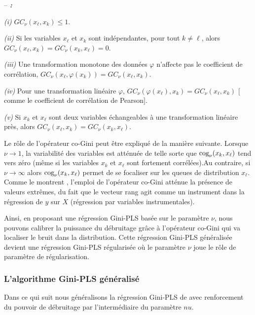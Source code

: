 \begin{property}\label{prop1} -- \textbf{\emph{\citet{Schechtman03}:}}
	
	\noindent \emph{(i)} $GC_\nu(x_\ell,x_k) \leq 1$.
	
	\noindent\emph{(ii)} Si les variables $x_\ell$ et $x_k$ sont indépendantes, pour tout $k\neq \ell$, alors $GC_\nu(x_\ell,x_k) = GC_\nu(x_k,x_\ell) =0$.
	
	\noindent\emph{(iii)} Une transformation monotone des données $\varphi$ n'affecte pas le coefficient de corrélation, $GC_\nu(x_\ell,\varphi(x_k)) = GC_\nu(x_\ell,x_k)$.
	
	\noindent\emph{(iv)} Pour une transformation linéaire $\varphi$, $GC_\nu(\varphi(x_\ell),x_k) = GC_\nu(x_\ell,x_k)$ $[$comme le coefficient de corrélation de Pearson$]$.
	
	\noindent\emph{(v)} Si $x_k$ et $x_\ell$ sont deux variables échangeables à une transformation linéaire près, alors $GC_\nu(x_\ell,x_k) = GC_\nu(x_k,x_\ell)$.
\end{property}

Le rôle de l'opérateur co-Gini peut être expliqué de la manière suivante. Lorsque $\nu \rightarrow 1$, la variabilité des variables est atténuée de telle sorte que $\text{cog}_\nu(x_k,x_\ell)$ tend vers zéro (même si les variables $x_k$ et $x_\ell$ sont fortement corrélées).Au contraire, si $\nu \rightarrow \infty $ alors $\text{cog}_\nu(x_k,x_\ell)$ permet de se focaliser sur les queues de distribution $x_\ell$. Comme le montrent \citet{olkin1992gini}, l'emploi de l'opérateur co-Gini atténue la présence de valeurs extrêmes, du fait que le vecteur rang agit comme un instrument dans la régression de $y$ sur $X$ (régression par variables instrumentales).    

Ainsi, en proposant une régression Gini-PLS basée sur le paramètre $\nu$, nous pouvons calibrer la puissance du débruitage  grâce à l'opérateur co-Gini qui va localiser le bruit dans la distribution. Cette régression Gini-PLS généralisée devient une régression Gini-PLS régularisée où le paramètre $\nu$ joue le rôle de paramètre de régularisation. 


\subsubsection{L'algorithme Gini-PLS généralisé} 

Dans ce qui suit nous généralisons la régression Gini-PLS de \citet{mussard2018ginipls} avec renforcement du pouvoir de débruitage par l'intermédiaire du paramètre $nu$.


